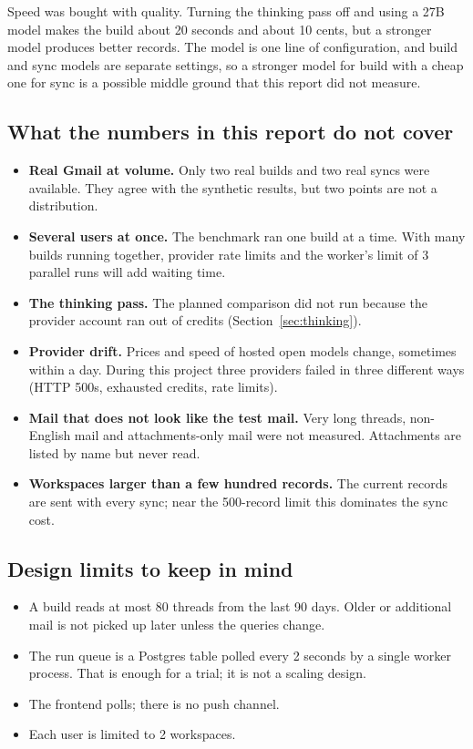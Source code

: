 \documentclass[10pt,a4paper]{article}
\begin{document}
Speed was bought with quality. Turning the thinking pass off and using a 27B model makes the
build about 20 seconds and about 10 cents, but a stronger model produces better records. The
model is one line of configuration, and build and sync models are separate settings, so a
stronger model for build with a cheap one for sync is a possible middle ground that this report
did not measure.

\subsection{What the numbers in this report do not cover}

\begin{itemize}
\item \textbf{Real Gmail at volume.} Only two real builds and two real syncs were available. They agree with the synthetic results, but two points are not a distribution.
\item \textbf{Several users at once.} The benchmark ran one build at a time. With many builds running together, provider rate limits and the worker's limit of 3 parallel runs will add waiting time.
\item \textbf{The thinking pass.} The planned comparison did not run because the provider account ran out of credits (Section~\ref{sec:thinking}).
\item \textbf{Provider drift.} Prices and speed of hosted open models change, sometimes within a day. During this project three providers failed in three different ways (HTTP 500s, exhausted credits, rate limits).
\item \textbf{Mail that does not look like the test mail.} Very long threads, non-English mail and attachments-only mail were not measured. Attachments are listed by name but never read.
\item \textbf{Workspaces larger than a few hundred records.} The current records are sent with every sync; near the 500-record limit this dominates the sync cost.
\end{itemize}

\subsection{Design limits to keep in mind}

\begin{itemize}
\item A build reads at most 80 threads from the last 90 days. Older or additional mail is not picked up later unless the queries change.
\item The run queue is a Postgres table polled every 2 seconds by a single worker process. That is enough for a trial; it is not a scaling design.
\item The frontend polls; there is no push channel.
\item Each user is limited to 2 workspaces.
\end{itemize}
\end{document}
